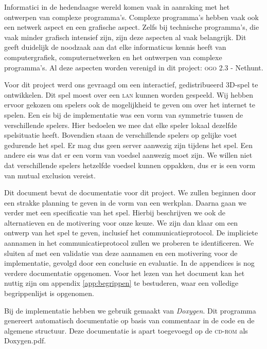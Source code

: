 Informatici in de hedendaagse wereld komen vaak in aanraking met het ontwerpen van complexe programma's. Complexe programma's hebben vaak ook een netwerk aspect en een grafische aspect. Zelfs bij technische programma's, die vaak minder grafisch intensief zijn, zijn deze aspecten al vaak belangrijk. Dit geeft duidelijk de noodzaak aan dat elke informaticus kennis heeft van computergrafiek, computernetwerken en het ontwerpen van complexe programma's. Al deze aspecten worden verenigd in dit project: \textsc{ogo} 2.3 - Nethunt.

Voor dit project werd ons gevraagd om een interactief, gedistribueerd 3D-spel te ontwikkelen. Dit spel moest over een \textsc{lan} kunnen worden gespeeld. Wij hebben ervoor gekozen om spelers ook de mogelijkheid te geven om over het internet te spelen. Een eis bij de implementatie was een vorm van symmetrie tussen de verschillende spelers. Hier bedoelen we mee dat elke speler lokaal dezelfde spelsituatie heeft. Bovendien staan de verschillende spelers op gelijke voet gedurende het spel. Er mag dus geen server aanwezig zijn tijdens het spel. Een andere eis was dat er een vorm van voedsel aanwezig moet zijn. We willen niet dat verschillende spelers hetzelfde voedsel kunnen oppakken, dus er is een vorm van mutual exclusion vereist.

Dit document bevat de documentatie voor dit project. We zullen beginnen door een strakke planning te geven in de vorm van een werkplan. Daarna gaan we verder met een specificatie van het spel. Hierbij beschrijven we ook de alternatieven en de motivering voor onze keuze. We zijn dan klaar om een ontwerp van het spel te geven, inclusief het communicatieprotocol. De impliciete aannamen in het communicatieprotocol zullen we proberen te identificeren. We sluiten af met een validatie van deze aannamen en een motivering voor de implementatie, gevolgd door een conclusie en evaluatie. In de appendices is nog verdere documentatie opgenomen. Voor het lezen van het document kan het nuttig zijn om appendix \ref{app:begrippen} te bestuderen, waar een volledige begrippenlijst is opgenomen.

Bij de implementatie hebben we gebruik gemaakt van \emph{Doxygen}. Dit programma genereert automatisch documentatie op basis van commentaar in de code en de algemene structuur. Deze documentatie is apart toegevoegd op de \textsc{cd-rom} als Doxygen.pdf. 